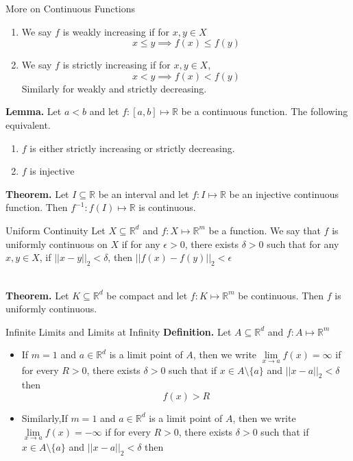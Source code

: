 \documentclass{article}
\begin{document}
\begin{multicols*}{3}
\begin{blackbox}{More on Continuous Functions}
    \begin{enumerate}[label=(\roman*)]
        \item We say $f$ is weakly increasing if for $x,y \in X$\\[-3ex]
        \[x \leq y \implies f(x) \leq f(y)\]
        \item We say $f$ is strictly increasing if for $x,y \in X$, \\[-3ex]
        \[x < y \implies f(x) < f(y)\]
        Similarly for weakly and strictly decreasing. 
    \end{enumerate}
    \textbf{Lemma.} Let $a < b$ and let $f: [a,b] \mapsto \mathbb{R}$ be a continuous function. The following equivalent. 
    \begin{enumerate}[label=(\roman*)]
        \item $f$ is either strictly increasing or strictly decreasing.
        \item $f$ is injective
    \end{enumerate}
    \textbf{Theorem.} Let $I \subseteq \mathbb{R}$ be an interval and let $f: I \mapsto \mathbb{R}$ be an injective continuous function. Then $f^{-1}: f(I) \mapsto \mathbb{R}$ is continuous. 
\begin{bluebox}{Uniform Continuity}
    Let $X \subseteq \mathbb{R}^d$ and $f: X \mapsto \mathbb{R}^m$ be a function. We say that $f$ is uniformly continuous on $X$ if for any $\epsilon > 0$, there exists $\delta > 0$ such that for any $x,y \in X$, if $||x - y||_2 < \delta$, then $||f(x) - f(y)||_2 < \epsilon$
\end{bluebox}\\[-0.5ex]
\textbf{Theorem.} Let $K \subseteq \mathbb{R}^d$ be compact and let $f: K \mapsto \mathbb{R}^m$ be continuous. Then $f$ is uniformly continuous.
\end{blackbox}
\begin{blackbox}{Infinite Limits and Limits at Infinity}
    \textbf{Definition.} Let $A \subseteq \mathbb{R}^d$ and $f: A \mapsto \mathbb{R}^m$
    \begin{itemize}
        \item If $m=1$ and $a \in \mathbb{R}^d$ is a limit point of $A$, then we write $\lim\limits_{x \rightarrow a} f(x) = \infty$ if for every $R > 0$, there exists $\delta > 0$ such that if $x \in A \setminus \{a\}$ and $||x-a||_2 < \delta$ then 
        \[f(x) > R\]
        \item Similarly,If $m=1$ and $a \in \mathbb{R}^d$ is a limit point of $A$, then we write $\lim\limits_{x \rightarrow a} f(x) = -\infty$ if for every $R > 0$, there exists $\delta > 0$ such that if $x \in A \setminus \{a\}$ and $||x-a||_2 < \delta$ then 

\end{itemize}
\end{blackbox}
\end{multicols*}
\end{document}
